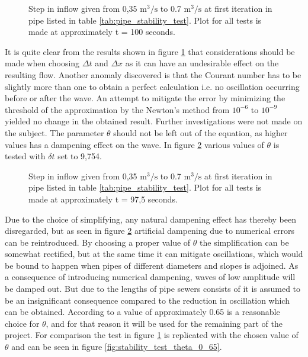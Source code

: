 \begin{figure}[H]
 \centering
 
\caption{Step in inflow given from 0,35 $\text{m}^\text{3}/ \text{s}$ to 0.7 $\text{m}^\text{3}/ \text{s}$ at first iteration in pipe listed in table \ref{tab:pipe_stability_test}. Plot for all tests is made at approximately t = 100 seconds.}
\label{fig:stability_test_theta_0_5}
\end{figure}

It is quite clear from the results shown in figure \ref{fig:stability_test_theta_0_5} that considerations should be made when choosing $\Delta t$ and $\Delta x$ as it can have an undesirable effect on the resulting flow. Another anomaly discovered is that the Courant number has to be slightly more than one to obtain a perfect calculation i.e. no oscillation occurring before or after the wave. An attempt to mitigate the error by minimizing the threshold of the approximation by the Newton's method from $10^{-6}$ to $10^{-9}$ yielded no change in the obtained result. Further investigations were not made on the subject.
The parameter $\theta$ should not be left out of the equation, as higher values has a dampening effect on the wave. In figure \ref{fig:stability_theta_test_05_065_1} various values of $\theta$ is tested  with $\delta t$ set to 9,754.    

\begin{figure}[H]
 \centering
 
\caption{Step in inflow given from 0,35 $\text{m}^\text{3}/ \text{s}$ to 0.7 $\text{m}^\text{3}/ \text{s}$ at first iteration in pipe listed in table \ref{tab:pipe_stability_test}. Plot for all tests is made at approximately t = 97,5 seconds.}
\label{fig:stability_theta_test_05_065_1}
\end{figure}

Due to the choice of simplifying, any natural dampening effect has thereby been disregarded, but as seen in figure \ref{fig:stability_theta_test_05_065_1} artificial dampening due to numerical errors can be reintroduced. By choosing a proper value of $\theta$ the simplification can be somewhat rectified, but at the same time it can mitigate oscillations, which would be bound to happen when pipes of different diameters and slopes is adjoined. As a consequence of introducing numerical dampening, waves of low amplitude will be damped out. But due to the lengths of pipe sewers consists of it is assumed to be an insignificant consequence compared to the reduction in oscillation which can be obtained. According to \cite{cunge1980practical} a value of approximately 0.65 is a reasonable choice for $\theta$, and for that reason it will be used for the remaining part of the project. For comparison the test in figure \ref{fig:stability_test_theta_0_5} is replicated with the chosen value of $\theta$ and can be seen in figure \ref{fig:stability_test_theta_0_65}.

